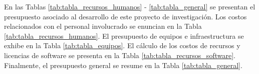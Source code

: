 En las Tablas \ref{tab:tabla_recursos_humanos} - \ref{tab:tabla_general} se presentan el presupuesto asociado al desarrollo de este proyecto de investigación. Los costos relacionados con el personal involucrado se enuncian en la Tabla \ref{tab:tabla_recursos_humanos}. El presupuesto de equipos e infraestructura se exhibe en la Tabla \ref{tab:tabla_equipos}. El cálculo de los costos de recursos y licencias de software se presenta en la Tabla \ref{tab:tabla_recursos_software}. Finalmente, el presupuesto general se resume en la Tabla \ref{tab:tabla_general}.

\renewcommand{\arraystretch}{1.5}

\begin{table}[!h]

\centering
{}
\caption{\hspace{2mm}Recursos humanos.}
\label{tab:tabla_recursos_humanos}
\end{table}



\begin{table}[!h]
\centering
{}
\caption{\hspace{2mm}Equipos e infraestructura.}
\label{tab:tabla_equipos}
\end{table}



